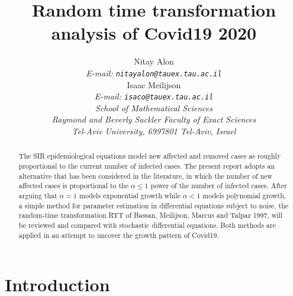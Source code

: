 \documentclass{article}
\begin{document}
\title {Random time transformation analysis of Covid19 2020
}

\author {
Nitay Alon
\\
{\em E-mail: \tt{nitayalon@tauex.tau.ac.il}} \\
Isaac Meilijson
\\
{\em E-mail: \tt{isaco@tauex.tau.ac.il}} \\
{\em School of Mathematical Sciences} \\
{\em Raymond and Beverly Sackler Faculty of Exact Sciences} \\
{\em Tel-Aviv University, 6997801 Tel-Aviv, Israel} \\
}


\maketitle


\begin{abstract}
\noindent The SIR epidemiological equations model new affected and removed cases as roughly proportional to the current number of infected cases. The present report adopts an alternative that has been considered in the literature, in which the number of new affected cases is proportional to the $\alpha \le 1$ power of the number of infected cases. After arguing that $\alpha=1$ models exponential growth while $\alpha<1$ models polynomial growth, a simple method for parameter estimation in differential equations subject to noise, the random-time transformation RTT of Bassan, Meilijson, Marcus and Talpaz 1997, will be reviewed and compared with stochastic differential equations. Both methods are applied in an attempt to uncover the growth pattern of Covid19.

%
\end{abstract}





\section{Introduction} \label{introduction}
\end{document}
